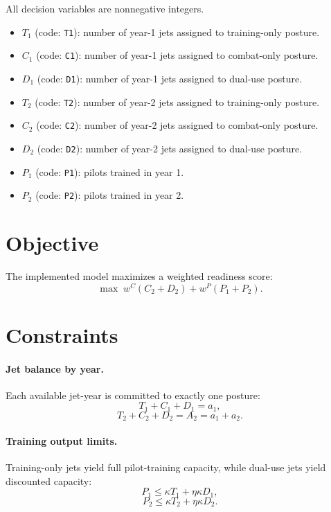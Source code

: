 All decision variables are nonnegative integers.

\begin{itemize}
    \item $T_1$ (code: \texttt{T1}): number of year-1 jets assigned to training-only posture.
    \item $C_1$ (code: \texttt{C1}): number of year-1 jets assigned to combat-only posture.
    \item $D_1$ (code: \texttt{D1}): number of year-1 jets assigned to dual-use posture.
    \item $T_2$ (code: \texttt{T2}): number of year-2 jets assigned to training-only posture.
    \item $C_2$ (code: \texttt{C2}): number of year-2 jets assigned to combat-only posture.
    \item $D_2$ (code: \texttt{D2}): number of year-2 jets assigned to dual-use posture.
    \item $P_1$ (code: \texttt{P1}): pilots trained in year 1.
    \item $P_2$ (code: \texttt{P2}): pilots trained in year 2.
\end{itemize}

\section*{Objective}

The implemented model maximizes a weighted readiness score:
\[
\max \; w^C(C_2 + D_2) + w^P(P_1 + P_2).
\]

\section*{Constraints}

\paragraph{Jet balance by year.}
Each available jet-year is committed to exactly one posture:
\[
T_1 + C_1 + D_1 = a_1,
\]
\[
T_2 + C_2 + D_2 = A_2 = a_1 + a_2.
\]

\paragraph{Training output limits.}
Training-only jets yield full pilot-training capacity, while dual-use jets yield discounted capacity:
\[
P_1 \le \kappa T_1 + \eta \kappa D_1,
\]
\[
P_2 \le \kappa T_2 + \eta \kappa D_2.
\]

